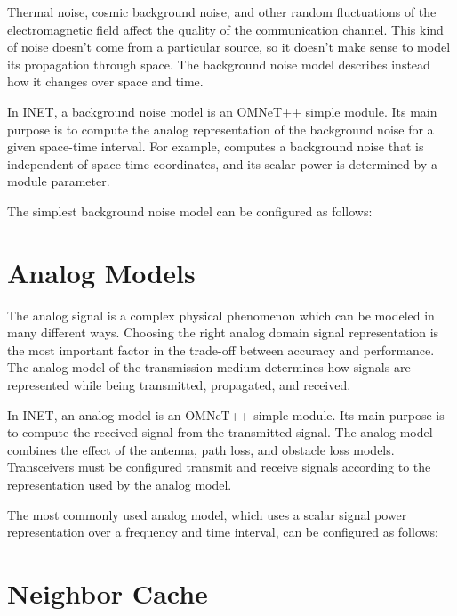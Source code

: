 Thermal noise, cosmic background noise, and other random fluctuations of
the electromagnetic field affect the quality of the communication channel.
This kind of noise doesn't come from a particular source, so it doesn't
make sense to model its propagation through space. The background noise
model describes instead how it changes over space and time.

In INET, a background noise model is an OMNeT++ simple module. Its main
purpose is to compute the analog representation of the background noise for
a given space-time interval. For example,
 computes a background noise that is
independent of space-time coordinates, and its scalar power is determined
by a module parameter.

The simplest background noise model can be configured as follows:


\section{Analog Models}
\label{sec:medium:analog-models}

The analog signal is a complex physical phenomenon which can be modeled in
many different ways. Choosing the right analog domain signal representation
is the most important factor in the trade-off between accuracy and
performance. The analog model of the transmission medium determines how
signals are represented while being transmitted, propagated, and received.

In INET, an analog model is an OMNeT++ simple module. Its main purpose is
to compute the received signal from the transmitted signal. The analog
model combines the effect of the antenna, path loss, and obstacle loss
models. Transceivers must be configured transmit and receive signals
according to the representation used by the analog model.

The most commonly used analog model, which uses a scalar signal power
representation over a frequency and time interval, can be configured as
follows:


\section{Neighbor Cache}
\label{sec:medium:neighbor-cache}

